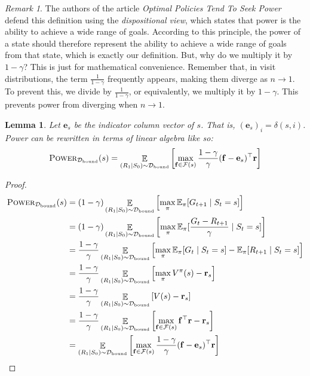 \documentclass{article}
\newtheorem{lemma}[theorem]{Lemma}
\theoremstyle{definition}
\theoremstyle{remark}
\newtheorem*{remark}{Remark}
\theoremstyle{example}
\DeclareMathOperator*{\opE}{\mathbb{E}}
\newcommand*{\rf}{\mathbf{r}}           %
\newcommand*{\f}{\mathbf{f}}            %
\newcommand*{\F}{\mathcal{F}}
\newcommand*{\D}{\mathcal{D}}
\newcommand*{\Dbd}{{\D_{\text{bound}}}} %
\newcommand*{\brx}[1]{\left[#1\right]}  %
\newcommand*{\E}[2]{\opE_{#1}\brx{#2}}  %
\newcommand*{\pwr}{\textsc{Power}}
\begin{document}
\begin{remark}
		The authors of the article \textit{Optimal Policies Tend To Seek Power} defend this definition using the \textit{dispositional view}, which states that power is the ability to achieve a wide range of goals. According to this principle, the power of a state should therefore represent the ability to achieve a wide range of goals from that state, which is exactly our definition. But, why do we multiply it by $1 - \gamma$? This is just for mathematical convenience. Remember that, in visit distributions, the term $\frac{1}{1 - \gamma}$ frequently appears, making them diverge as $n \rightarrow 1$. To prevent this, we divide by $\frac{1}{1 - \gamma}$, or equivalently, we multiply it by $1 - \gamma$. This prevents power from diverging when $n \rightarrow 1$.		
\end{remark}

\begin{lemma}
		Let $\mathbf{e}_s$ be the indicator column vector of $s$. That is, $(\mathbf{e}_s)_i = \delta(s, i)$. Power can be rewritten in terms of linear algebra like so:
				$$\pwr_\Dbd(s) = \E{(R_1 \mid S_0) \sim \Dbd}{\max_{\f \in \F(s)} \frac{1 - \gamma}{\gamma}(\f - \mathbf{e}_s)^\top \rf}$$
\end{lemma}

\begin{proof}
		\begin{align*}
				\pwr_\Dbd(s) &= (1 - \gamma) \E{(R_1 \mid S_0) \sim \Dbd}{\max_\pi \mathbb{E}_\pi[G_{t+1} \mid S_t = s]}\\
							 &= (1 - \gamma) \E{(R_1 \mid S_0) \sim \Dbd}{\max_\pi \mathbb{E}_\pi[\frac{G_t - R_{t+1}}{\gamma} \mid S_t = s]}\\
							 &= \frac{1 - \gamma}{\gamma} \E{(R_1 \mid S_0) \sim \Dbd}{\max_\pi \mathbb{E}_\pi[G_t \mid S_t = s] - \mathbb{E}_\pi[R_{t+1} \mid S_t = s]}\\
							 &= \frac{1 - \gamma}{\gamma} \E{(R_1 \mid S_0) \sim \Dbd}{\max_\pi V^\pi(s) - \rf_s}\\
							 &= \frac{1 - \gamma}{\gamma} \E{(R_1 \mid S_0) \sim \Dbd}{V(s) - \rf_s}\\
							 &= \frac{1 - \gamma}{\gamma} \E{(R_1 \mid S_0) \sim \Dbd}{\max_{\f \in \F(s)} \f^\top \rf - \rf_s}\\
							 &= \E{(R_1 \mid S_0) \sim \Dbd}{\max_{\f \in \F(s)} \frac{1 - \gamma}{\gamma}(\f - \mathbf{e}_s)^\top \rf}
		\end{align*}
\end{proof}
\end{document}
